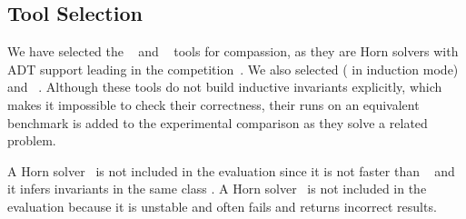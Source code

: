 \subsection{Tool Selection}
We have selected the \racer{}~\cite{10.1145/3498722} and \eldarica{}~\cite{8603013} tools for compassion, as they are Horn solvers with ADT support leading in the \chccomp{} competition~\cite{De_Angelis_2022}. We also selected \cvcind{} (\cvc{} in induction mode)~\cite{reynolds2015induction} and \vericat{}~\cite{10.1093/logcom/exab090}. Although these tools do not build inductive invariants explicitly, which makes it impossible to check their correctness, their runs on an equivalent benchmark is added to the experimental comparison as they solve a related problem.

A \hoice{} Horn solver~\cite{10.1007/978-3-030-02768-1_8} is not included in the evaluation since it is not faster than \racer{}~\cite{10.1145/3498722} and it infers invariants in the same class \elemclass{}.
A \rchc{} Horn solver~\cite{haude2020} is not included in the evaluation because it is unstable and often fails and returns incorrect results.

